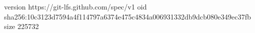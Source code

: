version https://git-lfs.github.com/spec/v1
oid sha256:10c3123d7594a4f114797a6374e475c4834a006931332db9dcb080e349ec37fb
size 225732

